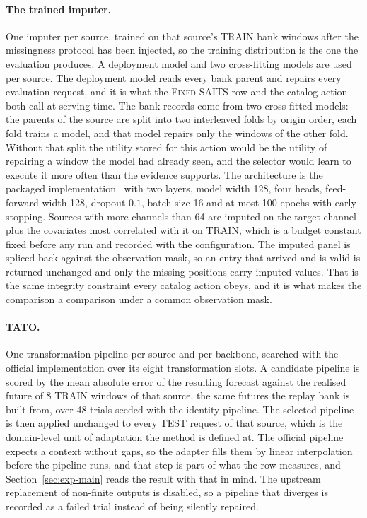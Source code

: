\documentclass{article}
\begin{document}
\paragraph{The trained imputer.} One imputer per source, trained on that source's TRAIN bank
windows after the missingness protocol has been injected, so the training distribution is the
one the evaluation produces. A deployment model and two cross-fitting models are used per source. The deployment model reads every
bank parent and repairs every evaluation request, and it is what the \textsc{Fixed SAITS} row
and the catalog action both call at serving time. The bank records come from two cross-fitted models: the parents of the source are split into two interleaved folds by origin order, each fold trains a model, and
that model repairs only the windows of the other fold. Without that split the utility stored
for this action would be the utility of repairing a window the model had already seen, and the
selector would learn to execute it more often than the evidence supports. The architecture is the packaged implementation~\citep{du2023pypots} with
two layers, model width 128, four heads, feed-forward width 128, dropout $0.1$, batch size 16
and at most 100 epochs with early stopping. Sources with more channels than
64 are imputed on the target channel plus the covariates most correlated with it
on TRAIN, which is a budget constant fixed before any run and recorded with the configuration.
The imputed panel is spliced back against the observation mask, so an entry that arrived and is
valid is returned unchanged and only the missing positions carry imputed values. That is the
same integrity constraint every catalog action obeys, and it is what makes the comparison a
comparison under a common observation mask.

\paragraph{TATO.} One transformation pipeline per source and per backbone, searched with the
official implementation over its eight transformation slots. A candidate pipeline is scored by
the mean absolute error of the resulting forecast against the realised future of
8 TRAIN windows of that source, the same futures the replay bank is built from,
over 48 trials seeded with the identity pipeline. The selected pipeline is then
applied unchanged to every TEST request of that source, which is the domain-level unit of
adaptation the method is defined at. The official pipeline expects a context without gaps, so
the adapter fills them by linear interpolation before the pipeline runs, and that step is
part of what the row measures, and Section~\ref{sec:exp-main} reads the result with that in
mind. The upstream replacement of non-finite outputs is disabled, so a pipeline that diverges
is recorded as a failed trial instead of being silently repaired.
\end{document}
